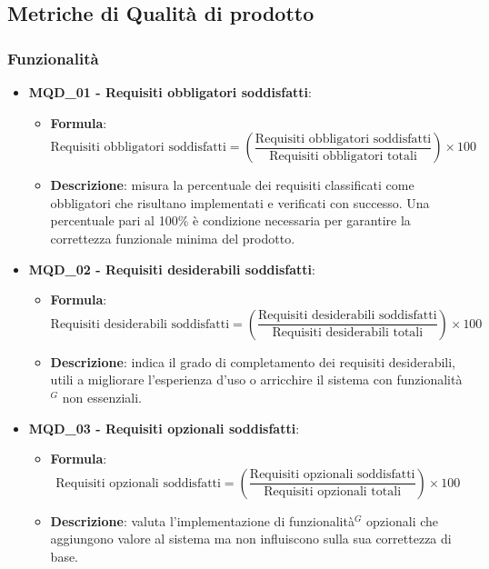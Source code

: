 \subsection{Metriche di Qualità di prodotto}

\subsubsection{Funzionalità}
\begin{itemize}
\item \textbf{MQD\_01 - Requisiti obbligatori soddisfatti}:
    \begin{itemize}
        \item \textbf{Formula}:
        \[
            \text{Requisiti obbligatori soddisfatti} = 
            \left(
                \frac{\text{Requisiti obbligatori soddisfatti}}
                     {\text{Requisiti obbligatori totali}}
            \right) \times 100
        \]
        \item \textbf{Descrizione}: misura la percentuale dei requisiti classificati come obbligatori che risultano implementati e verificati con successo. Una percentuale pari al 100\% è condizione necessaria per garantire la correttezza funzionale minima del prodotto.
    \end{itemize}

\item \textbf{MQD\_02 - Requisiti desiderabili soddisfatti}:
    \begin{itemize}
        \item \textbf{Formula}:
        \[
			\text{Requisiti desiderabili soddisfatti} =
            \left(
                \frac{\text{Requisiti desiderabili soddisfatti}}
                     {\text{Requisiti desiderabili totali}}
            \right) \times 100
        \]
        \item \textbf{Descrizione}: indica il grado di completamento dei requisiti desiderabili, utili a migliorare l’esperienza d’uso o arricchire il sistema con funzionalità$^G$ non essenziali.
    \end{itemize}

\item \textbf{MQD\_03 - Requisiti opzionali soddisfatti}:
    \begin{itemize}
        \item \textbf{Formula}:
        \[
			\text{Requisiti opzionali soddisfatti} =
            \left(
                \frac{\text{Requisiti opzionali soddisfatti}}
                     {\text{Requisiti opzionali totali}}
            \right) \times 100
        \]
        \item \textbf{Descrizione}: valuta l’implementazione di funzionalità$^G$ opzionali che aggiungono valore al sistema ma non influiscono sulla sua correttezza di base.
    \end{itemize}
\end{itemize}

